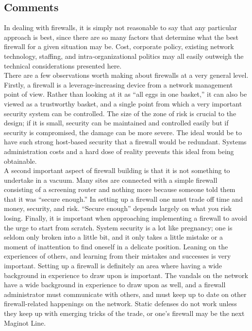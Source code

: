 \subsection{Comments}
In dealing with firewalls, it is simply not reasonable to say that any
particular approach is best, since there are so many factors that
determine what the best firewall for a given situation may be. Cost,
corporate policy, existing network technology, staffing, and
intra-organizational politics may all easily outweigh the technical
considerations presented here.\\

There are a few observations worth making about firewalls at a very
general level. Firstly, a firewall is a leverage-increasing device from
a network management point of view. Rather than looking at it as ``all
eggs in one basket,'' it can also be viewed as a trustworthy basket,
and a single point from which a very important security system can be
controlled. The size of the zone of risk is crucial to the design; if
it is small, security can be maintained and controlled easily but if
security is compromised, the damage can be more severe. The ideal would
be to have such strong host-based security that a firewall would be
redundant. Systems administration costs and a hard dose of reality
prevents this ideal from being obtainable.\\

A second important aspect of firewall building is that it is not
something to undertake in a vacuum. Many sites are connected with a
simple firewall consisting of a screening router and nothing more
because someone told them that it was ``secure enough.'' In setting up
a firewall one must trade off time and money, security, and risk.
``Secure enough'' depends largely on what you risk losing. Finally, it
is important when approaching implementing a firewall to avoid the urge
to start from scratch. System security is a lot like pregnancy; one is
seldom only broken into a little bit, and it only takes a little
mistake or a moment of inattention to find oneself in a delicate
position. Leaning on the experiences of others, and learning from their
mistakes and successes is very important. Setting up a firewall is
definitely an area where having a wide background in experience to draw
upon is important. The vandals on the network have a wide background in
experience to draw upon as well, and a firewall administrator must
communicate with others, and must keep up to date on other
firewall-related happenings on the network. Static defenses do not work
unless they keep up with emerging tricks of the trade, or one's
firewall may be the next Maginot Line.


